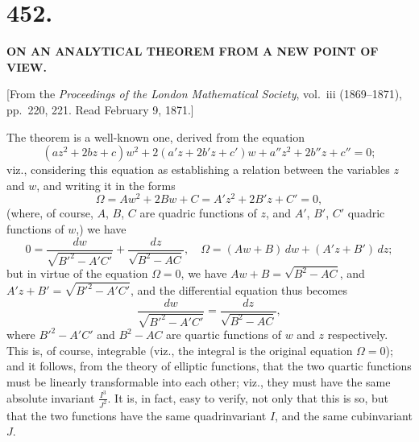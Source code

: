 \documentclass[11pt,a4paper]{article}
\begin{document}
\section*{\textbf{452.}}

\begin{center}
\textbf{ON AN ANALYTICAL THEOREM FROM A NEW POINT OF VIEW.}
\end{center}

[From the \textit{Proceedings of the London Mathematical Society}, vol.~iii (1869--1871), pp.~220, 221. Read February 9, 1871.]

The theorem is a well-known one, derived from the equation
\[
(az^2 + 2bz + c)w^2 + 2(a'z + 2b'z + c')w + a''z^2 + 2b''z + c'' = 0;
\]
viz., considering this equation as establishing a relation between the variables $z$ and $w$, and writing it in the forms
\[
\Omega = Aw^2 + 2Bw + C = A'z^2 + 2B'z + C' = 0,
\]
(where, of course, $A$, $B$, $C$ are quadric functions of $z$, and $A'$, $B'$, $C'$ quadric functions of $w$,) we have
\[
0 = \frac{dw}{\sqrt{B'^2 - A'C'}} + \frac{dz}{\sqrt{B^2 - AC}},\quad
\Omega = (Aw + B)\,dw + (A'z + B')\,dz;
\]
but in virtue of the equation $\Omega = 0$, we have $Aw + B = \sqrt{B^2 - AC}$, and $A'z + B' = \sqrt{B'^2 - A'C'}$, and the differential equation thus becomes
\[
\frac{dw}{\sqrt{B'^2 - A'C'}} = \frac{dz}{\sqrt{B^2 - AC}},
\]
where $B'^2 - A'C'$ and $B^2 - AC$ are quartic functions of $w$ and $z$ respectively. This is, of course, integrable (viz., the integral is the original equation $\Omega = 0$); and it follows, from the theory of elliptic functions, that the two quartic functions must be linearly transformable into each other; viz., they must have the same absolute invariant $\frac{I^3}{J^2}$. It is, in fact, easy to verify, not only that this is so, but that the two functions have the same quadrinvariant $I$, and the same cubinvariant $J$.
\end{document}
